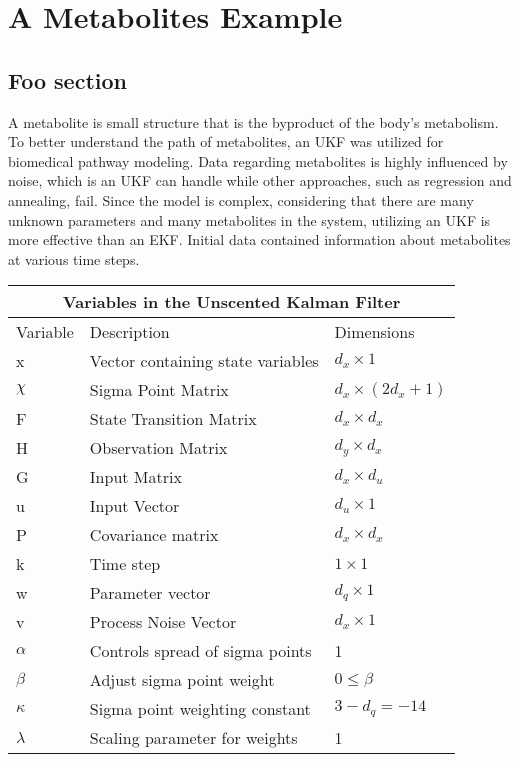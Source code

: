 \chapter{A Metabolites Example}
\label{A Metabolites Example}

\section{Foo section}
A metabolite is small structure that is the byproduct of the body's metabolism. To better understand the path of metabolites, an UKF was utilized for biomedical pathway modeling. Data regarding metabolites is highly influenced by noise, which is an UKF can handle while other approaches, such as regression and annealing, fail. Since the model is complex, considering that there are many unknown parameters and many metabolites in the system, utilizing an UKF is more effective than an EKF. Initial data contained information about metabolites at various time steps.
\begin{center}
    
\centering
\begin{tabular}{ |p{2cm}||p{5cm}|p{3cm}| }
    \hline
    \multicolumn{3}{|c|}{Variables in the Unscented Kalman Filter } \\ 
    \hline
    Variable & Description & Dimensions \\
    \hline
    x & Vector containing state variables & $d_x \times 1 $\\ 
    $\chi $& Sigma Point Matrix &$ d_x \times (2 d_x + 1) $\\
    F & State Transition Matrix  & $d_x \times d_x $  \\ 
    H & Observation Matrix & $d_y \times d_x$\\
    G & Input Matrix & $d_x \times d_u$\\
    u & Input Vector  & $d_u \times 1$\\
    P & Covariance matrix & $d_x \times d_x $  \\
    k & Time step  & $1 \times 1$\\
    w & Parameter vector & $d_q \times 1$\\
    v & Process Noise Vector & $d_x \times 1$\\
    $\alpha$ & Controls spread of sigma points & 1 \\
    $\beta$ & Adjust sigma point weight & $0 \leq  \beta$ \\
    $\kappa $ & Sigma point weighting constant & $3 - d_q = -14 $ \\
    $\lambda $ & Scaling parameter for weights & 1 \\
    \hline
\end{tabular}
\end{center}

